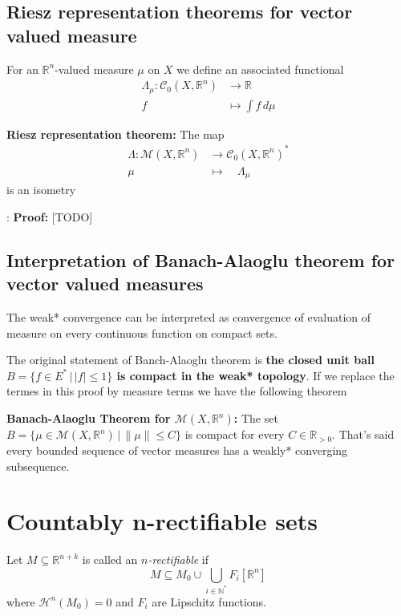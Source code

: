 \documentclass{article}
\begin{document}
\subsection{Riesz representation theorems for vector valued measure}
For an $\mathbb{R}^n$-valued measure $\mu$ on $X$ we define an associated
functional
\begin{align*}
    \Lambda_\mu:\mathcal C_0(X,\mathbb{R}^n)&\rightarrow\mathbb{R}\\
    f&\mapsto\int f\,d\mu
\end{align*}

\textbf{Riesz representation theorem:}
The map
\begin{align*}
    \Lambda:\mathcal{M}(X, \mathbb{R}^n)&\rightarrow\mathcal{C}_0(X,\mathbb{R}^n)^*\\
    \mu\quad&\mapsto\quad\Lambda_\mu
\end{align*}
is an isometry

\vspace{1ex}:
\textbf{Proof:} [TODO]

\subsection{Interpretation of Banach-Alaoglu theorem for vector valued measures}
The weak* convergence can be interpreted as convergence of evaluation of measure
on every continuous function on compact sets.

\vspace{2ex}
The original statement of Banch-Alaoglu theorem is \textbf{the closed unit ball
$B=\{f\in E^*\,|\,|f|\leq 1\}$ is compact in the weak* topology}. If we replace
the termes in this proof by measure terms we have the following theorem

\vspace{1ex}
\textbf{Banach-Alaoglu Theorem for $\mathcal M(X,\mathbb{R}^n)$:}
The set $B=\{\mu\in\mathcal M(X,\mathbb{R}^n)\,|\,\|\mu\|\leq C\}$ is compact
for every $C\in\mathbb{R}_{>0}$. That's said every bounded sequence of vector
measures has a weakly* converging subsequence.


\section{Countably n-rectifiable sets}
Let $M\subseteq\mathbb{R}^{n+k}$ is called an \emph{$n$-rectifiable} if
\[
    M\subseteq M_0\cup\bigcup_{i\in\mathbb{N}^*}F_i[\mathbb{R}^n]
\]
where $\mathcal{H}^n(M_0)=0$ and $F_i$ are Lipschitz functions.
\end{document}

